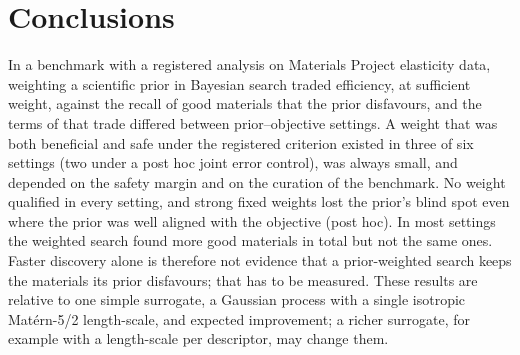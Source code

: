 \section{Conclusions}\label{sec:conclusions}
In a benchmark with a registered analysis on Materials Project elasticity data, weighting a scientific prior in Bayesian search
traded efficiency, at sufficient weight, against the recall of good materials that the prior disfavours, and the terms of that trade differed between
prior--objective settings. A weight that was both beneficial and safe under the registered criterion existed in three of six
settings (two under a post hoc joint error control), was always small, and depended on the safety margin and on the curation of
the benchmark. No weight qualified in every setting, and strong fixed weights lost the prior's blind spot even where the prior
was well aligned with the objective (post hoc). In most settings the weighted search found more good materials in total but not the same ones. Faster discovery alone is
therefore not evidence that a prior-weighted search keeps the materials its prior disfavours; that has to be measured. These
results are relative to one simple surrogate, a Gaussian process with a single isotropic Mat\'ern-5/2 length-scale, and expected
improvement; a richer surrogate, for example with a length-scale per descriptor, may change them.
